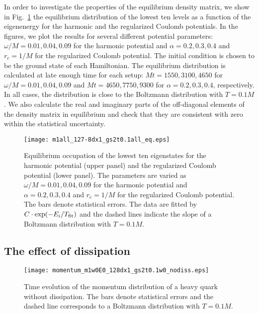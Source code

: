 \documentclass[prd,11pt, amsmath, amsymb, aps, reprint, tightenlines, nofootinbib, longbibliography, abbrv, preprintnumbers]{revtex4-1}
\begin{document}
In order to investigate the properties of the equilibrium density matrix, we show in Fig.~\ref{fig:potential_equilibrium} the equilibrium distribution of the lowest ten levels as a function of the eigenenergy for the harmonic and the regularized Coulomb potentials.
In the figures, we plot the results for several different potential parameters: $\omega/M = 0.01, 0.04, 0.09$ for the harmonic potential and $\alpha = 0.2, 0.3, 0.4$ and $r_c=1/M$ for the regularized Coulomb potential.
The initial condition is chosen to be the ground state of each Hamiltonian.
The equilibrium distribution is calculated at late enough time for each
setup: $Mt=1550, 3100, 4650$ for $\omega/M=0.01, 0.04, 0.09$ and
$Mt=4650, 7750, 9300$ for $\alpha=0.2, 0.3, 0.4$, respectively.
In all cases, the distribution is close to the Boltzmann distribution with $T=0.1M$.
We also calculate the real and imaginary parts of the off-diagonal elements of the density matrix in equilibrium and check that they are consistent with zero within the statistical uncertainty.

\begin{figure}
\centering
\texttt{[image: m1all\_127-8dx1\_gs2t0.1all\_eq.eps]}
\caption{
Equilibrium occupation of the lowest ten eigenstates for the harmonic potential (upper panel) and the regularized Coulomb potential (lower panel).
The parameters are varied as $\omega/M=0.01, 0.04, 0.09$ for the harmonic potential and $\alpha=0.2, 0.3, 0.4$ and $r_c=1/M$ for the regularized Coulomb potential.
The bars denote statistical errors.
The data are fitted by $C\cdot\exp(-E_i/T_{\rm fit})$ and the dashed lines indicate the slope of a Boltzmann distribution with $T=0.1M$.
}
\label{fig:potential_equilibrium}
\end{figure}


\subsection{The effect of dissipation}
\begin{figure}
\centering
\texttt{[image: momentum\_m1w0E0\_128dx1\_gs2t0.1w0\_nodiss.eps]}
\caption{
Time evolution of the momentum distribution of a heavy quark without dissipation.
The bars denote statistical errors and the dashed line corresponds to a Boltzmann distribution with $T=0.1M$.
}
\label{fig:free_pdist_nodiss}
\end{figure}
\end{document}
